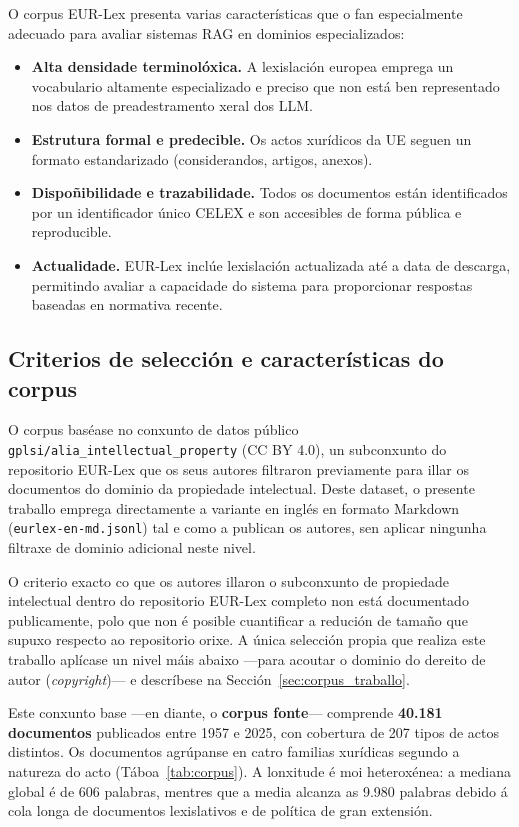 \documentclass[11pt, a4paper, oneside]{report}
\begin{document}
O corpus EUR-Lex presenta varias características que o fan especialmente adecuado para
avaliar sistemas RAG en dominios especializados:

\begin{itemize}
  \item \textbf{Alta densidade terminolóxica.} A lexislación europea emprega un vocabulario
    altamente especializado e preciso que non está ben representado nos datos de
    preadestramento xeral dos LLM.
  \item \textbf{Estrutura formal e predecible.} Os actos xurídicos da UE seguen un
    formato estandarizado (considerandos, artigos, anexos).
  \item \textbf{Dispoñibilidade e trazabilidade.} Todos os documentos están identificados
    por un identificador único CELEX e son accesibles de forma pública e reproducible.
  \item \textbf{Actualidade.} EUR-Lex inclúe lexislación actualizada até a data de
    descarga, permitindo avaliar a capacidade do sistema para proporcionar respostas
    baseadas en normativa recente.
\end{itemize}

\subsection{Criterios de selección e características do corpus}
\label{sec:criterios_corpus}

O corpus baséase no conxunto de datos público
\texttt{gplsi/alia\_intellectual\_property} \citep{espinosa2025alia} (CC BY 4.0),
un subconxunto do repositorio EUR-Lex que os seus autores filtraron previamente para
illar os documentos do dominio da propiedade intelectual. Deste dataset, o presente
traballo emprega directamente a variante en inglés en formato Markdown
(\texttt{eurlex-en-md.jsonl}) tal e como a publican os autores, sen aplicar ningunha
filtraxe de dominio adicional neste nivel.

O criterio exacto co que os autores illaron o subconxunto de propiedade intelectual
dentro do repositorio EUR-Lex completo non está documentado publicamente, polo que non
é posible cuantificar a redución de tamaño que supuxo respecto ao repositorio orixe. A
única selección propia que realiza este traballo aplícase un nivel máis abaixo —para
acoutar o dominio do dereito de autor (\textit{copyright})— e descríbese na
Sección~\ref{sec:corpus_traballo}.

Este conxunto base —en diante, o \textbf{corpus fonte}— comprende \textbf{40.181
documentos} publicados entre 1957 e 2025, con cobertura de 207 tipos de actos distintos.
Os documentos agrúpanse en catro familias xurídicas segundo a natureza do acto
(Táboa~\ref{tab:corpus}). A lonxitude é moi heteroxénea: a mediana global é de 606
palabras, mentres que a media alcanza as 9.980 palabras debido á cola longa de documentos
lexislativos e de política de gran extensión.
\end{document}
